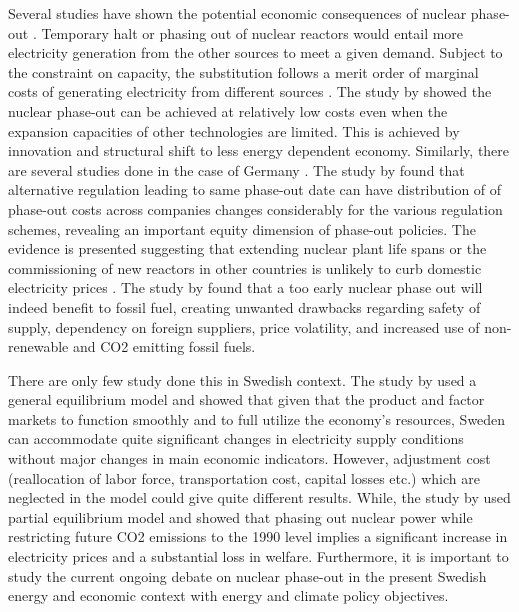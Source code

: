 \documentclass[10pt,a4paper]{article}
\begin{document}
Several studies have shown the potential economic consequences of nuclear phase-out \citep{Bohringer2002, Nestle2012, Bretschger2012, Duscha0, Glomsrod2013, Kunsch2014}. Temporary halt or phasing out of nuclear reactors would entail more electricity generation from the other sources to meet a given demand. Subject to the constraint on capacity, the substitution follows a merit order of marginal costs of generating electricity from different sources \citep{Glomsrod2013}. The study by \cite{Bretschger2012} showed the nuclear phase-out can be achieved at relatively low costs even when the expansion capacities of other technologies are limited. This is achieved by innovation and structural shift to less energy dependent economy. Similarly, there are several studies done in the case of Germany \citep{Bohringer2002, Nestle2012}. The study by \cite{Bohringer2002} found that alternative regulation leading to same phase-out date can have distribution of of phase-out costs across companies changes considerably for the various regulation schemes, revealing an important equity dimension of phase-out policies. The evidence is presented suggesting that extending nuclear plant life spans or the commissioning of new reactors in other countries is unlikely to curb domestic electricity prices \citep{Nestle2012}. The study by \cite{Kunsch2014} found that a too early nuclear phase out will indeed benefit to fossil fuel, creating unwanted drawbacks regarding safety of supply, dependency on foreign suppliers, price volatility, and increased use of non-renewable and CO2 emitting fossil fuels.

There are only few study done this in Swedish context. The study by \citep{Bergman1981} used a general equilibrium model and showed that given that the product and factor markets to function smoothly and to full utilize the economy's resources, Sweden can accommodate quite significant changes in electricity supply conditions without major changes in main economic indicators. However, adjustment cost (reallocation of labor force, transportation cost, capital losses etc.) which are neglected in the model could give quite different results. While, the study by \cite{ Andersson1997} used partial equilibrium model and showed that phasing out nuclear power while restricting future CO2 emissions to the 1990 level implies a significant increase in electricity prices and a substantial loss in welfare. Furthermore, it is important to study the current ongoing debate on nuclear phase-out in the present Swedish energy and economic context with energy and climate policy objectives.
\end{document}
